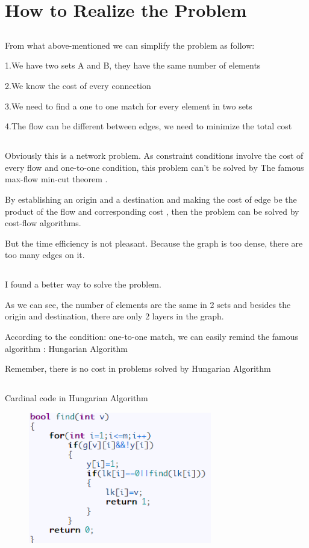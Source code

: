\documentclass[12pt]{article}
\begin{document}
\section{How to Realize the Problem}
\subsection{}
From what above-mentioned we can simplify the problem as follow:

1.We have two sets A and B, they have the same number of elements

2.We know the cost of every connection

3.We need to find a one to one match for every element in two sets

4.The flow can be different between edges, we need to minimize the total cost
\subsection{}
Obviously this is a network problem.
As constraint conditions involve the cost of every flow and one-to-one condition, this problem can’t be solved by   The famous max-flow min-cut theorem .

By establishing an origin and a destination and making the cost of edge be the product of the flow and corresponding cost , then the problem can be solved by cost-flow algorithms.

But the time efficiency is not pleasant. Because the graph is too dense, there are too many edges on it.
\subsection{}
I found a better way to solve the problem.

As we can see, the number of elements are the same in 2 sets and besides the origin and destination, there are only 2 layers in the graph.

According to the condition: one-to-one match, we can easily remind the famous algorithm : Hungarian Algorithm

Remember, there is no cost in problems solved by Hungarian Algorithm
\subsection{}
Cardinal code in Hungarian Algorithm

\begin{figure}[H]
  \centering
  \includegraphics[width=8cm]{2.png}\\
\end{figure}
\end{document}
